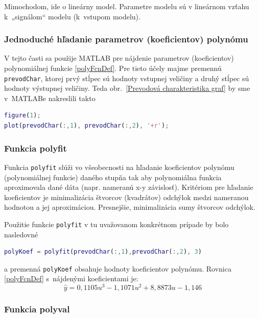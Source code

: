 \documentclass[a4paper, 10pt, ]{article}
\begin{document}
Mimochodom, ide o lineárny model. Parametre modelu sú v lineárnom vzťahu k~„signálom“ modelu (k~vstupom modelu).


\subsubsection{Jednoduché hľadanie parametrov (koeficientov) polynómu}

V tejto časti sa použije MATLAB pre nájdenie parametrov (koeficientov) polynomiálnej funkcie \eqref{polyFcnDef}. Pre tieto účely majme premennú \verb|prevodChar|, ktorej prvý stĺpec sú hodnoty vstupnej veličiny a druhý stĺpec sú hodnoty výstupnej veličiny. Teda obr.~\ref{Prevodová charakteristika graf} by sme v~MATLABe nakreslili takto
\begin{lstlisting}[language=Matlab, numbers=none]
figure(1);
plot(prevodChar(:,1), prevodChar(:,2), '+r');
\end{lstlisting}


\subsubsection{Funkcia polyfit}

Funkcia \verb|polyfit| slúži vo všeobecnosti na hľadanie koeficientov polynómu (polynomiálnej funkcie) daného stupňa tak aby polynomiálna funkcia aproximovala dané dáta (napr. nameranú x-y závislosť). Kritériom pre hľadanie koeficientov je minimalizácia štvorcov (kvadrátov) odchýlok medzi nameranou hodnotou a jej aproximáciou. Presnejšie, minimalizácia sumy štvorcov odchýlok.

Použitie funkcie \verb|polyfit| v tu uvažovanom konkrétnom prípade by bolo nasledovné
\begin{lstlisting}[language=Matlab, numbers=none]
polyKoef = polyfit(prevodChar(:,1),prevodChar(:,2), 3)
\end{lstlisting}
a premenná \verb|polyKoef| obsahuje hodnoty koeficientov polynómu. Rovnica \eqref{polyFcnDef} s~nájdenými koeficientami je:
\begin{equation} \label{modelPolifitVysl}
    \hat y = 0,1105 u^3  -1,1071 u^2 + 8,8873 u  -1,146
\end{equation}


\subsubsection{Funkcia polyval}
\end{document}
